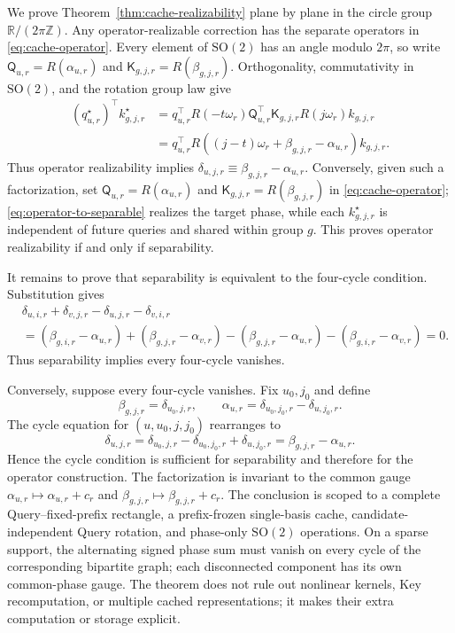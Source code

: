 We prove Theorem~\ref{thm:cache-realizability} plane by plane in the circle group
$\mathbb R/(2\pi\mathbb Z)$.  Any operator-realizable correction has the
separate operators in \cref{eq:cache-operator}.  Every element of
$\mathrm{SO}(2)$ has an angle modulo $2\pi$, so write
$\mathsf Q_{u,r}=R(\alpha_{u,r})$ and
$\mathsf K_{g,j,r}=R(\beta_{g,j,r})$.  Orthogonality, commutativity in
$\mathrm{SO}(2)$, and the rotation group law give
\begin{align}
  (q^\star_{u,r})^\top k^\star_{g,j,r}
  &=q_{u,r}^\top R(-t\omega_r)\mathsf Q_{u,r}^\top
    \mathsf K_{g,j,r}R(j\omega_r)k_{g,j,r}\\
  &=q_{u,r}^\top R((j-t)\omega_r+\beta_{g,j,r}-\alpha_{u,r})k_{g,j,r}.
  \label{eq:operator-to-separable}
\end{align}
Thus operator realizability implies
$\delta_{u,j,r}\equiv\beta_{g,j,r}-\alpha_{u,r}$.  Conversely, given such a
factorization, set $\mathsf Q_{u,r}=R(\alpha_{u,r})$ and
$\mathsf K_{g,j,r}=R(\beta_{g,j,r})$ in \cref{eq:cache-operator};
\cref{eq:operator-to-separable} realizes the target phase, while each
$k^\star_{g,j,r}$ is independent of future queries and shared within group
$g$.  This proves operator realizability if and only if separability.

It remains to prove that separability is equivalent to the four-cycle
condition.  Substitution gives
\begin{align}
  &\delta_{u,i,r}+\delta_{v,j,r}
  -\delta_{u,j,r}-\delta_{v,i,r}\\
  &=(\beta_{g,i,r}-\alpha_{u,r})
   +(\beta_{g,j,r}-\alpha_{v,r})
   -(\beta_{g,j,r}-\alpha_{u,r})
   -(\beta_{g,i,r}-\alpha_{v,r})=0.
\end{align}
Thus separability implies every four-cycle vanishes.

Conversely, suppose every four-cycle vanishes.  Fix $u_0,j_0$ and define
\begin{equation}
  \beta_{g,j,r}=\delta_{u_0,j,r},
  \qquad
  \alpha_{u,r}=\delta_{u_0,j_0,r}-\delta_{u,j_0,r}.
\end{equation}
The cycle equation for $(u,u_0,j,j_0)$ rearranges to
\begin{equation}
  \delta_{u,j,r}=\delta_{u_0,j,r}
  -\delta_{u_0,j_0,r}+\delta_{u,j_0,r}
  =\beta_{g,j,r}-\alpha_{u,r}.
\end{equation}
Hence the cycle condition is sufficient for separability and therefore for the
operator construction.  The factorization is invariant to the common gauge
$\alpha_{u,r}\mapsto\alpha_{u,r}+c_r$ and
$\beta_{g,j,r}\mapsto\beta_{g,j,r}+c_r$.  The conclusion is scoped to a
complete Query--fixed-prefix rectangle, a prefix-frozen single-basis cache,
candidate-independent Query rotation, and phase-only $\mathrm{SO}(2)$
operations.  On a sparse support, the alternating signed phase sum must vanish
on every cycle of the corresponding bipartite graph; each disconnected
component has its own common-phase gauge.  The theorem does not rule out nonlinear kernels, Key
recomputation, or multiple cached representations; it makes their extra
computation or storage explicit.

